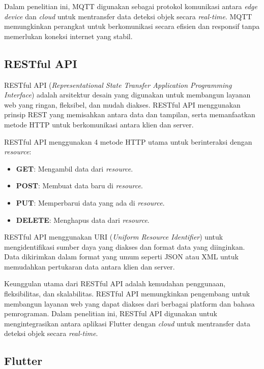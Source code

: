 Dalam penelitian ini, MQTT digunakan sebagai protokol komunikasi antara \emph{edge device} dan \emph{cloud} untuk mentransfer data deteksi objek secara \emph{real-time}. MQTT memungkinkan perangkat untuk berkomunikasi secara efisien dan responsif tanpa memerlukan koneksi internet yang stabil. \parencite*{mqtts2008}

\subsection{RESTful API}

RESTful API (\emph{Representational State Transfer Application Programming Interface}) adalah arsitektur desain yang digunakan untuk membangun layanan web yang ringan, fleksibel, dan mudah diakses. RESTful API menggunakan prinsip REST yang memisahkan antara data dan tampilan, serta memanfaatkan metode HTTP untuk berkomunikasi antara klien dan server.

RESTful API menggunakan 4 metode HTTP utama untuk berinteraksi dengan \emph{resource}:
\begin{itemize}
  \item \textbf{GET}: Mengambil data dari \emph{resource}.
  \item \textbf{POST}: Membuat data baru di \emph{resource}.
  \item \textbf{PUT}: Memperbarui data yang ada di \emph{resource}.
  \item \textbf{DELETE}: Menghapus data dari \emph{resource}.
\end{itemize}

RESTful API menggunakan URI (\emph{Uniform Resource Identifier}) untuk mengidentifikasi sumber daya yang diakses dan format data yang diinginkan. Data dikirimkan dalam format yang umum seperti JSON atau XML untuk memudahkan pertukaran data antara klien dan server. \parencite*{restapi2016}

Keunggulan utama dari RESTful API adalah kemudahan penggunaan, fleksibilitas, dan skalabilitas. RESTful API memungkinkan pengembang untuk membangun layanan web yang dapat diakses dari berbagai platform dan bahasa pemrograman. Dalam penelitian ini, RESTful API digunakan untuk mengintegrasikan antara aplikasi Flutter dengan \emph{cloud} untuk mentransfer data deteksi objek secara \emph{real-time}.

\subsection{Flutter}

